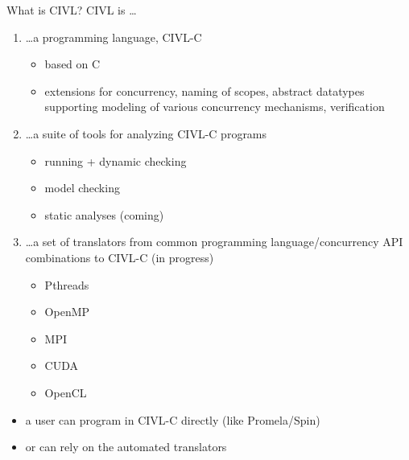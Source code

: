 \documentclass[t]{beamer}
\begin{document}
\begin{frame}{What is CIVL?}
  CIVL is \ldots
  \begin{enumerate}
  \item \ldots a programming language, \alert{CIVL-C}
    \begin{itemize}
    \item based on C
    \item extensions for concurrency, naming of scopes, abstract
      datatypes supporting modeling of various concurrency mechanisms,
      verification
    \end{itemize}
  \item \ldots a suite of tools for analyzing CIVL-C programs
    \begin{itemize}
    \item running + dynamic checking
    \item model checking
    \item static analyses (coming)
    \end{itemize}
  \item \ldots a set of translators from common programming
    language/concurrency API combinations to CIVL-C (in progress)
    \begin{itemize}
    \item Pthreads
    \item OpenMP
    \item MPI
    \item CUDA
    \item OpenCL
    \end{itemize}
  \end{enumerate}

  \begin{itemize}
  \item a user can program in CIVL-C directly (like Promela/Spin)
  \item or can rely on the automated translators
  \end{itemize}
\end{frame}
\end{document}
